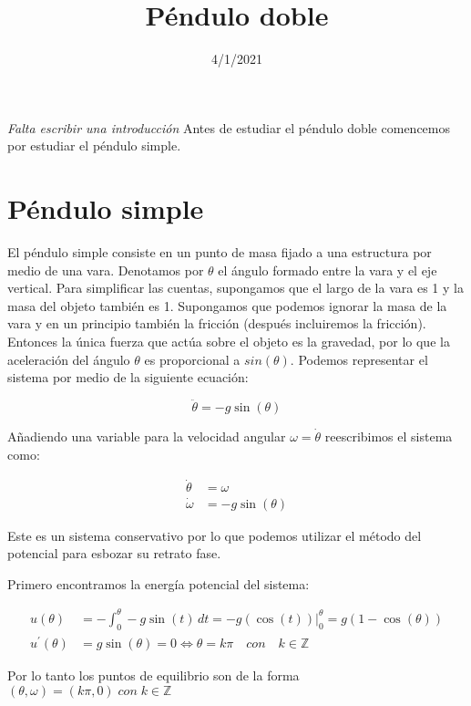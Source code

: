 \documentclass[
]{article}
\title{Péndulo doble}
\author{}
\date{\vspace{-2.5em}4/1/2021}
\begin{document}
\maketitle

\emph{Falta escribir una introducción} Antes de estudiar el péndulo
doble comencemos por estudiar el péndulo simple.

\hypertarget{puxe9ndulo-simple}{%
\section{Péndulo simple}\label{puxe9ndulo-simple}}

El péndulo simple consiste en un punto de masa fijado a una estructura
por medio de una vara. Denotamos por \(\theta\) el ángulo formado entre
la vara y el eje vertical. Para simplificar las cuentas, supongamos que
el largo de la vara es 1 y la masa del objeto también es 1. Supongamos
que podemos ignorar la masa de la vara y en un principio también la
fricción (después incluiremos la fricción). Entonces la única fuerza que
actúa sobre el objeto es la gravedad, por lo que la aceleración del
ángulo \(\theta\) es proporcional a \(sin(\theta)\). Podemos representar
el sistema por medio de la siguiente ecuación:

\[
\ddot{\theta} = -g \sin(\theta)
\]

Añadiendo una variable para la velocidad angular
\(\omega = \dot{\theta}\) reescribimos el sistema como:

\[
\begin{aligned}
\dot{\theta} & = \omega \\
\dot{\omega} & = - g \sin(\theta)
\end{aligned}
\]

Este es un sistema conservativo por lo que podemos utilizar el método
del potencial para esbozar su retrato fase.

Primero encontramos la energía potencial del sistema:

\[
\begin{aligned}
u(\theta) & = - \int_{0}^{\theta} -g \sin(t) \,dt = -g \left(\cos(t)\right)\Big|_{0}^{\theta} = g \left(1 - \cos(\theta)\right) \\
u^{\prime}(\theta) & = g \sin(\theta) = 0 \iff \theta = k \pi \quad con \quad k \in \mathbb{Z}
\end{aligned}
\]

Por lo tanto los puntos de equilibrio son de la forma
\((\theta, \omega) = (k \pi, 0) \; con \; k \in \mathbb{Z}\)
\end{document}
